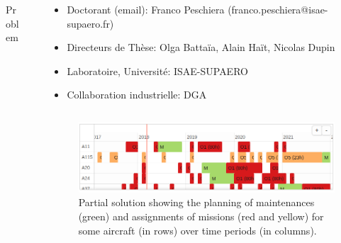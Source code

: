 \documentclass[final]{beamer}
\newlength{\sepwid}
\newlength{\onecolwid}
\newlength{\twocolwid}
\begin{document}
\begin{frame}[t]
\begin{columns}[t]
\begin{column}{\onecolwid}
\begin{block}{Problem}
		\end{block}

	\end{column} %

	\begin{column}{\sepwid}\end{column} %

	\begin{column}{\twocolwid} %


	\begin{column}{\onecolwid}\end{column} %

	\begin{column}{\twocolwid}
			\vspace*{-5ex}
			\begin{alertblock}{}				
				\begin{itemize}
					\item Doctorant (email): Franco Peschiera (franco.peschiera@isae-supaero.fr)
					\item Directeurs de Thèse: Olga Battaïa, Alain Haït, Nicolas Dupin
					\item Laboratoire, Université: ISAE-SUPAERO
					\item Collaboration industrielle: DGA
				\end{itemize}
			\end{alertblock}

	\end{column}

	\begin{column}{\onecolwid}\end{column} %

		\begin{figure}
			\includegraphics[width=1\linewidth]{img/calendar2.png}
			\caption{Partial solution showing the planning of maintenances (green) and assignments of missions (red and yellow) for some aircraft (in rows) over time periods (in columns).}
		\end{figure}


\end{column}
\end{columns}
\end{frame}
\end{document}
